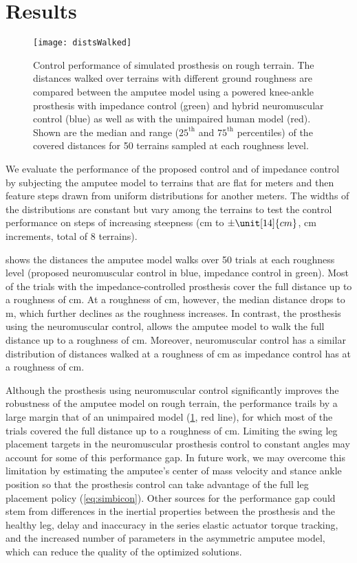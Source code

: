 \section{Results}\label{sec:completed_comparison_results}
\begin{figure}[t]
    \centering
    \texttt{[image: distsWalked]}
    \caption{Control performance of simulated prosthesis on rough terrain. The
    distances walked over terrains with different ground roughness are compared
    between the amputee model using a powered knee-ankle prosthesis with
    impedance control (green) and hybrid neuromuscular control (blue) as well
    as with the unimpaired human model (red). Shown are the median and range
    ($25^\textrm{th}$ and $75^\textrm{th}$ percentiles) of the covered
    distances for 50 terrains sampled at each roughness level.
    }\label{fig:distsWalked}
\end{figure}

We evaluate the performance of the proposed control and of impedance control by
subjecting the amputee model to terrains that are flat for \unit[10]{meters} and
then feature steps drawn from uniform distributions for another
\unit[90]{meters}.  The widths of the distributions are constant but vary among
the terrains to test the control performance on steps of increasing steepness
(\unit[0]{cm} to $\pm \unit[14]{cm}$, \unit[2]{cm} increments, total of 8
terrains). 

 shows the distances the amputee model walks over 50
trials at each roughness level (proposed neuromuscular control in blue,
impedance control in green). Most of the trials with the impedance-controlled
prosthesis cover the full distance up to a roughness of \unit[2]{cm}. At a
roughness of \unit[4]{cm}, however, the median distance drops to \unit[34]{m},
which further declines as the roughness increases. In contrast, the  prosthesis
using the neuromuscular control, allows the amputee model to walk the full
distance up to a roughness of \unit[6]{cm}. Moreover, neuromuscular control has
a similar distribution of distances walked at a roughness of \unit[8]{cm} as
impedance control has at a roughness of \unit[4]{cm}.

Although the prosthesis using neuromuscular control significantly improves the
robustness of the amputee model on rough terrain, the performance trails by a
large margin that of an unimpaired model (\cref{fig:distsWalked}, red line), for
which most of the trials covered the full distance up to a roughness of
\unit[10]{cm}.  Limiting the swing leg placement targets in the neuromuscular
prosthesis control to constant angles may account for some of this performance
gap. In future work, we may overcome this limitation by estimating the amputee's
center of mass velocity and stance ankle position so that the prosthesis control
can take advantage of the full leg placement policy (\cref{eq:simbicon}). Other
sources for the performance gap could stem from differences in the inertial
properties between the prosthesis and the healthy leg, delay and inaccuracy in
the series elastic actuator torque tracking, and the increased number of
parameters in the asymmetric amputee model, which can reduce the quality of the
optimized solutions.

